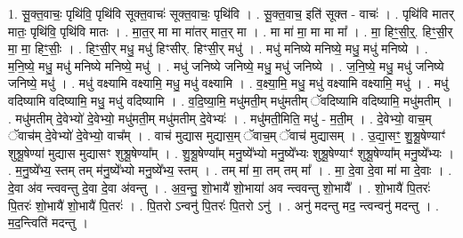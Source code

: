 \documentclass[17pt]{extarticle}
\begin{document}
1. सू॒क्त॒वाचः॒ पृथि॑वि॒ पृथि॑वि सूक्त॒वाचः॑ सूक्त॒वाचः॒ पृथि॑वि । . सू॒क्त॒वाच॒ इति॑ सूक्त - वाचः॑ । . पृथि॑वि मातर् मातः॒ पृथि॑वि॒ पृथि॑वि मातः । . मा॒त॒र् मा मा मा॑तर् मात॒र् मा । . मा मा॑ मा॒ मा मा मा᳚ । . मा॒ हिꣳ॒॒सी॒र्॒. हिꣳ॒॒सी॒र् मा॒ मा॒ हिꣳ॒॒सीः॒ । . हिꣳ॒॒सी॒र् मधु॒ मधु॑ हिꣳसीर्. हिꣳसी॒र् मधु॑ । . मधु॑ मनिष्ये मनिष्ये॒ मधु॒ मधु॑ मनिष्ये । . म॒नि॒ष्ये॒ मधु॒ मधु॑ मनिष्ये मनिष्ये॒ मधु॑ । . मधु॑ जनिष्ये जनिष्ये॒ मधु॒ मधु॑ जनिष्ये । . ज॒नि॒ष्ये॒ मधु॒ मधु॑ जनिष्ये जनिष्ये॒ मधु॑ । . मधु॑ वक्ष्यामि वक्ष्यामि॒ मधु॒ मधु॑ वक्ष्यामि । . व॒क्ष्या॒मि॒ मधु॒ मधु॑ वक्ष्यामि वक्ष्यामि॒ मधु॑ । . मधु॑ वदिष्यामि वदिष्यामि॒ मधु॒ मधु॑ वदिष्यामि । . व॒दि॒ष्या॒मि॒ मधु॑मती॒म् मधु॑मतीम् ॅवदिष्यामि वदिष्यामि॒ मधु॑मतीम् । . मधु॑मतीम् दे॒वेभ्यो॑ दे॒वेभ्यो॒ मधु॑मती॒म् मधु॑मतीम् दे॒वेभ्यः॑ । . मधु॑मती॒मिति॒ मधु॑ - म॒ती॒म् । . दे॒वेभ्यो॒ वाच॒म् ॅवाच॑म् दे॒वेभ्यो॑ दे॒वेभ्यो॒ वाच᳚म् । . वाच॑ मुद्यास मुद्यास॒म् ॅवाच॒म् ॅवाच॑ मुद्यासम् । . उ॒द्या॒सꣳ॒॒ शु॒श्रू॒षेण्याꣳ॑ शुश्रू॒षेण्या॑ मुद्यास मुद्यासꣳ शुश्रू॒षेण्या᳚म् । . शु॒श्रू॒षेण्या᳚म् मनु॒ष्ये᳚भ्यो मनु॒ष्ये᳚भ्यः शुश्रू॒षेण्याꣳ॑ शुश्रू॒षेण्या᳚म् मनु॒ष्ये᳚भ्यः । . म॒नु॒ष्ये᳚भ्य॒ स्तम् तम् म॑नु॒ष्ये᳚भ्यो मनु॒ष्ये᳚भ्य॒ स्तम् । . तम् मा॑ मा॒ तम् तम् मा᳚ । . मा॒ दे॒वा दे॒वा मा॑ मा दे॒वाः । . दे॒वा अ॑व न्त्ववन्तु दे॒वा दे॒वा अ॑वन्तु । . अ॒व॒न्तु॒ शो॒भायै॑ शो॒भाया॑ अव न्त्ववन्तु शो॒भायै᳚ । . शो॒भायै॑ पि॒तरः॑ पि॒तरः॑ शो॒भायै॑ शो॒भायै॑ पि॒तरः॑ । . पि॒तरो ऽन्वनु॑ पि॒तरः॑ पि॒तरो ऽनु॑ । . अनु॑ मदन्तु मद॒ न्त्वन्वनु॑ मदन्तु । . म॒द॒न्त्विति॑ मदन्तु । \newline
\end{document}
